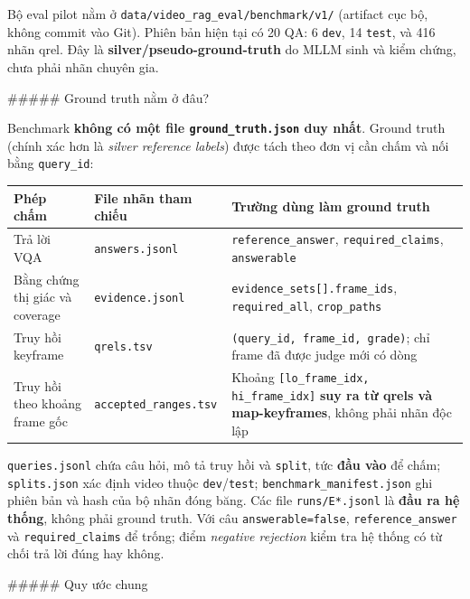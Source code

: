 \documentclass[12pt,a4paper,onecolumn]{article}
\begin{document}
Bộ eval pilot nằm ở \texttt{data/video\_rag\_eval/benchmark/v1/} (artifact cục bộ, không commit vào Git). Phiên bản hiện tại có 20 QA: 6 \texttt{dev}, 14 \texttt{test}, và 416 nhãn qrel. Đây là \textbf{silver/pseudo-ground-truth} do MLLM sinh và kiểm chứng, chưa phải nhãn chuyên gia.

\#\#\#\#\# Ground truth nằm ở đâu?

Benchmark \textbf{không có một file \texttt{ground\_truth.json} duy nhất}. Ground truth (chính xác hơn là \textit{silver reference labels}) được tách theo đơn vị cần chấm và nối bằng \texttt{query\_id}:

\begin{center}
\begin{tabular}{l l l}
\toprule
Phép chấm & File nhãn tham chiếu & Trường dùng làm ground truth \\
\midrule
Trả lời VQA & \texttt{answers.jsonl} & \texttt{reference\_answer}, \texttt{required\_claims}, \texttt{answerable} \\
Bằng chứng thị giác và coverage & \texttt{evidence.jsonl} & \texttt{evidence\_sets[].frame\_ids}, \texttt{required\_all}, \texttt{crop\_paths} \\
Truy hồi keyframe & \texttt{qrels.tsv} & \texttt{(query\_id, frame\_id, grade)}; chỉ frame đã được judge mới có dòng \\
Truy hồi theo khoảng frame gốc & \texttt{accepted\_ranges.tsv} & Khoảng \texttt{[lo\_frame\_idx, hi\_frame\_idx]} \textbf{suy ra từ qrels và map-keyframes}, không phải nhãn độc lập \\
\bottomrule
\end{tabular}
\end{center}


\texttt{queries.jsonl} chứa câu hỏi, mô tả truy hồi và \texttt{split}, tức \textbf{đầu vào} để chấm; \texttt{splits.json} xác định video thuộc \texttt{dev}/\texttt{test}; \texttt{benchmark\_manifest.json} ghi phiên bản và hash của bộ nhãn đóng băng. Các file \texttt{runs/E*.jsonl} là \textbf{đầu ra hệ thống}, không phải ground truth. Với câu \texttt{answerable=false}, \texttt{reference\_answer} và \texttt{required\_claims} để trống; điểm \textit{negative rejection} kiểm tra hệ thống có từ chối trả lời đúng hay không.

\#\#\#\#\# Quy ước chung
\end{document}
